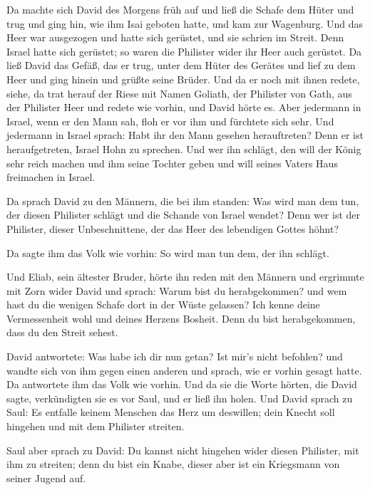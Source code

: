  Da machte sich David des Morgens früh auf und ließ die
Schafe dem Hüter und trug und ging hin, wie ihm Isai geboten hatte, und
kam zur Wagenburg. Und das Heer war ausgezogen und hatte sich gerüstet,
und sie schrien im Streit.  Denn Israel hatte sich
gerüstet; so waren die Philister wider ihr Heer auch gerüstet.
 Da ließ David das Gefäß, das er trug, unter dem Hüter
des Gerätes und lief zu dem Heer und ging hinein und grüßte seine
Brüder.  Und da er noch mit ihnen redete, siehe, da trat
herauf der Riese mit Namen Goliath, der Philister von Gath, aus der
Philister Heer und redete wie vorhin, und David hörte es.
 Aber jedermann in Israel, wenn er den Mann sah, floh er
vor ihm und fürchtete sich sehr.  Und jedermann in Israel
sprach: Habt ihr den Mann gesehen herauftreten? Denn er ist
heraufgetreten, Israel Hohn zu sprechen. Und wer ihn schlägt, den will
der König sehr reich machen und ihm seine Tochter geben und will seines
Vaters Haus freimachen in Israel.

 Da sprach David zu den Männern, die bei ihm standen: Was
wird man dem tun, der diesen Philister schlägt und die Schande von
Israel wendet? Denn wer ist der Philister, dieser Unbeschnittene, der
das Heer des lebendigen Gottes höhnt?

 Da sagte ihm das Volk wie vorhin: So wird man tun dem,
der ihn schlägt.

 Und Eliab, sein ältester Bruder, hörte ihn reden mit den
Männern und ergrimmte mit Zorn wider David und sprach: Warum bist du
herabgekommen? und wem hast du die wenigen Schafe dort in der Wüste
gelassen? Ich kenne deine Vermessenheit wohl und deines Herzens Bosheit.
Denn du bist herabgekommen, dass du den Streit sehest.

 David antwortete: Was habe ich dir nun getan? Ist mir's
nicht befohlen?  und wandte sich von ihm gegen einen
anderen und sprach, wie er vorhin gesagt hatte. Da antwortete ihm das
Volk wie vorhin.  Und da sie die Worte hörten, die David
sagte, verkündigten sie es vor Saul, und er ließ ihn holen.
 Und David sprach zu Saul: Es entfalle keinem Menschen
das Herz um deswillen; dein Knecht soll hingehen und mit dem Philister
streiten.

 Saul aber sprach zu David: Du kannst nicht hingehen
wider diesen Philister, mit ihm zu streiten; denn du bist ein Knabe,
dieser aber ist ein Kriegsmann von seiner Jugend auf.

